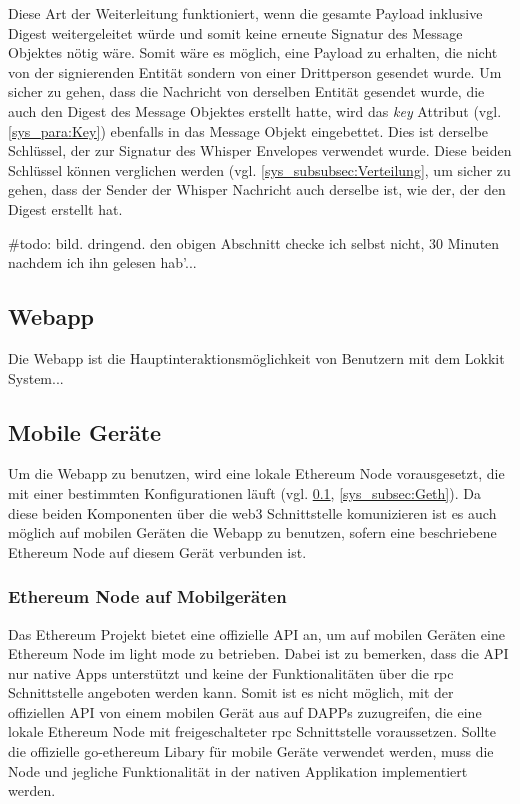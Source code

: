 Diese Art der Weiterleitung funktioniert, wenn die gesamte Payload inklusive Digest weitergeleitet würde und somit keine erneute Signatur des Message Objektes nötig wäre. Somit wäre es möglich, eine Payload zu erhalten, die nicht von der signierenden Entität sondern von einer Drittperson gesendet wurde. Um sicher zu gehen, dass die Nachricht von derselben Entität gesendet wurde, die auch den Digest des Message Objektes erstellt hatte, wird das \emph{key} Attribut (vgl. \ref{sys_para:Key}) ebenfalls in das Message Objekt eingebettet. Dies ist derselbe Schlüssel, der zur Signatur des Whisper Envelopes verwendet wurde. Diese beiden Schlüssel können verglichen werden (vgl. \ref{sys_subsubsec:Verteilung}, um sicher zu gehen, dass der Sender der Whisper Nachricht auch derselbe ist, wie der, der den Digest erstellt hat.

\#todo: bild. dringend. den obigen Abschnitt checke ich selbst nicht, 30 Minuten nachdem ich ihn gelesen hab'...

\subsection{Webapp}
\label{subsec:Webapp}
Die Webapp ist die Hauptinteraktionsmöglichkeit von Benutzern mit dem Lokkit System...

\subsection{Mobile Geräte}
Um die Webapp zu benutzen, wird eine lokale Ethereum Node vorausgesetzt, die mit einer bestimmten Konfigurationen läuft (vgl. \ref{subsec:Webapp}, \ref{sys_subsec:Geth}). Da diese beiden Komponenten über die web3 Schnittstelle komunizieren ist es auch möglich auf mobilen Geräten die Webapp zu benutzen, sofern eine beschriebene Ethereum Node auf diesem Gerät verbunden ist.

\subsubsection{Ethereum Node auf Mobilgeräten}
Das Ethereum Projekt bietet eine offizielle API an, um auf mobilen Geräten eine Ethereum Node im light mode zu betrieben. Dabei ist zu bemerken, dass die API nur native Apps unterstützt und keine der Funktionalitäten über die rpc Schnittstelle angeboten werden kann. Somit ist es nicht möglich, mit der offiziellen API von einem mobilen Gerät aus auf \acrshort{DAPPs} zuzugreifen, die eine lokale Ethereum Node mit freigeschalteter rpc Schnittstelle voraussetzen. Sollte die offizielle go-ethereum Libary für mobile Geräte verwendet werden, muss die Node und jegliche Funktionalität in der nativen Applikation implementiert werden.\cite[wiki/Mobile: Introduction]{go-ethereum}

